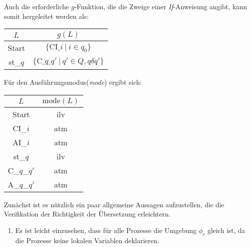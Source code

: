 Auch die erforderliche $g$-Funktion, die die Zweige einer \emph{If}-Anweisung angibt, kann somit hergeleitet werden als:

\begin{tabular}{|c|c|}
  \hline
  $L$ & $g(L)$\\
  \hline
  Start & $\{ \textrm{CI\_}i\ |\ i\in q_0 \}$\\
  st\_$q$ & $\{ \textrm{C\_}q\textrm{\_}q'\ |\ q'\in Q, q\delta q' \}$\\
  \hline
\end{tabular}

Für den Ausführungsmodus(\emph{mode}) ergibt sich:

\begin{tabular}{|c|c|}
  \hline
  $L$ & $\textrm{mode}(L)$\\
  \hline
  Start & ilv\\
  CI\_$i$ & atm\\
  AI\_$i$ & atm\\
  st\_$q$ & ilv\\
  C\_$q$\_$q'$ & atm\\
  A\_$q$\_$q'$ & atm\\
  \hline
\end{tabular}

Zunächst ist es nützlich ein paar allgemeine Aussagen aufzustellen, die die Verifikation der Richtigkeit der Übersetzung erleichtern.
\begin{enumerate}
\item Es ist leicht einzusehen, dass für alle Prozesse die Umgebung $\phi_e$ gleich ist, da die Prozesse keine lokalen Variablen deklarieren.
\end{enumerate}

